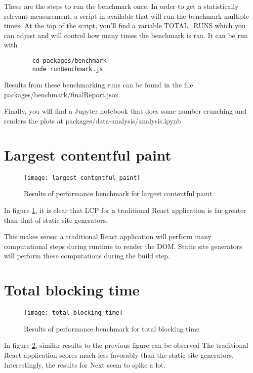 These are the steps to run the benchmark once. In order to get a statistically relevant measurement, a script in available that will run the benchmark multiple times.
At the top of the script, you'll find a variable TOTAL\_RUNS which you can adjust and will control how many times the benchmark is ran.
It can be run with

\begin{verbatim}
		cd packages/benchmark
		node runBenchmark.js
\end{verbatim}

Results from these benchmarking runs can be found in the file packages/benchmark/finalReport.json

Finally, you will find a Jupyter notebook that does some number crunching and renders the plots at packages/data-analysis/analysis.ipynb

\section{Largest contentful paint}

\begin{figure}[htb!]
	\texttt{[image: largest\_contentful\_paint]}{}
	\caption{Results of performance benchmark for largest contentful paint}
	\label{fig:largest_contentful_paint}
\end{figure}

In figure \ref{fig:largest_contentful_paint}, it is clear that LCP for a traditional React application is far greater than that of static site generators.

This makes sense: a traditional React application will perform many computational steps during runtime to render the DOM.
Static site generators will perform these computations during the build step.

\section{Total blocking time}


\begin{figure}[htb!]
	\texttt{[image: total\_blocking\_time]}
	\caption{Results of performance benchmark for total blocking time}
	\label{fig:total_blocking_time}
\end{figure}

In figure \ref{fig:total_blocking_time}, similar results to the previous figure can be observed
The traditional React application scores much less favorably than the static site generators.
Interestingly, the results for Next seem to spike a lot.

